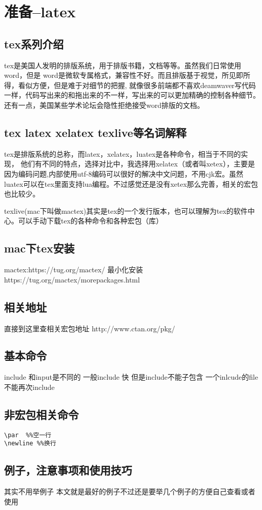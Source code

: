 \section{准备--latex}
\subsection{tex系列介绍}
 tex是美国人发明的排版系统，用于排版书籍，文档等等。虽然我们日常使用word，但是
 word是微软专属格式，兼容性不好。而且排版基于视觉，所见即所得，看似方便，但是难于对细节的把握,
 就像很多前端都不喜欢deamwaver写代码一样，代码写出来的和拖出来的不一样，写出来的可以更加精确的控制各种细节。
 还有一点，美国某些学术论坛会隐性拒绝接受word排版的文档。
\subsection{tex latex xelatex texlive等名词解释}
 tex是排版系统的总称，而latex，xelatex，luatex是各种命令，相当于不同的实现，
 他们有不同的特点，选择对比中，我选择用xelatex（或者叫xetex），主要是因为编码问题,内部使用utf-8编码可以很好的解决中文问题，不用cjk宏。虽然luatex可以在tex里面支持lua编程。不过感觉还是没有xetex那么完善，相关的宏包也比较少。\par
 texlive(mac下叫做mactex)其实是tex的一个发行版本，也可以理解为tex的软件中心。可以手动下载tex的各种命令和各种宏包（库）
\subsection{mac下tex安装}
mactex:https://tug.org/mactex/
最小化安装https://tug.org/mactex/morepackages.html
\subsection{相关地址}
直接到这里查相关宏包地址 http://www.ctan.org/pkg/
\subsection{基本命令}
include 和input是不同的 一般include 快 但是include不能子包含
一个inlcude的file不能再次include
\subsection{非宏包相关命令}
\begin{lstlisting}
\par  %%空一行
\newline %%换行
\end{lstlisting}
\subsection{例子，注意事项和使用技巧}
其实不用举例子 本文就是最好的例子不过还是要举几个例子的方便自己查看或者使用
